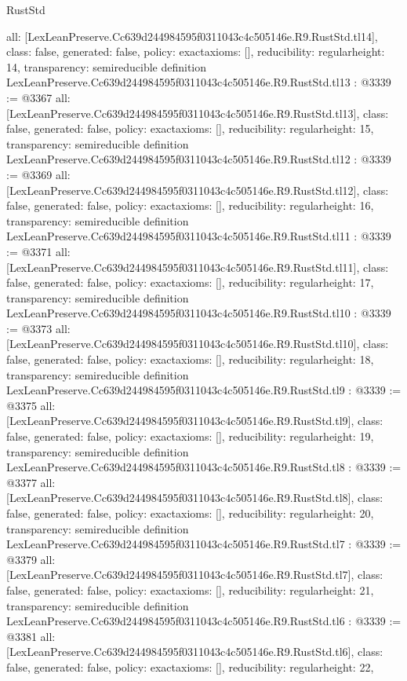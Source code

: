 \begin{lexlean}{RustStd}
\begin{coremodule}
{  all: [LexLeanPreserve.Cc639d244984595f0311043c4c505146e.R9.RustStd.tl14],
  class: false,
  generated: false,
  policy: exact{axioms: []},
  reducibility: regular{height: 14},
  transparency: semireducible
}
definition LexLeanPreserve.Cc639d244984595f0311043c4c505146e.R9.RustStd.tl13 : @3339 := @3367 {
  all: [LexLeanPreserve.Cc639d244984595f0311043c4c505146e.R9.RustStd.tl13],
  class: false,
  generated: false,
  policy: exact{axioms: []},
  reducibility: regular{height: 15},
  transparency: semireducible
}
definition LexLeanPreserve.Cc639d244984595f0311043c4c505146e.R9.RustStd.tl12 : @3339 := @3369 {
  all: [LexLeanPreserve.Cc639d244984595f0311043c4c505146e.R9.RustStd.tl12],
  class: false,
  generated: false,
  policy: exact{axioms: []},
  reducibility: regular{height: 16},
  transparency: semireducible
}
definition LexLeanPreserve.Cc639d244984595f0311043c4c505146e.R9.RustStd.tl11 : @3339 := @3371 {
  all: [LexLeanPreserve.Cc639d244984595f0311043c4c505146e.R9.RustStd.tl11],
  class: false,
  generated: false,
  policy: exact{axioms: []},
  reducibility: regular{height: 17},
  transparency: semireducible
}
definition LexLeanPreserve.Cc639d244984595f0311043c4c505146e.R9.RustStd.tl10 : @3339 := @3373 {
  all: [LexLeanPreserve.Cc639d244984595f0311043c4c505146e.R9.RustStd.tl10],
  class: false,
  generated: false,
  policy: exact{axioms: []},
  reducibility: regular{height: 18},
  transparency: semireducible
}
definition LexLeanPreserve.Cc639d244984595f0311043c4c505146e.R9.RustStd.tl9 : @3339 := @3375 {
  all: [LexLeanPreserve.Cc639d244984595f0311043c4c505146e.R9.RustStd.tl9],
  class: false,
  generated: false,
  policy: exact{axioms: []},
  reducibility: regular{height: 19},
  transparency: semireducible
}
definition LexLeanPreserve.Cc639d244984595f0311043c4c505146e.R9.RustStd.tl8 : @3339 := @3377 {
  all: [LexLeanPreserve.Cc639d244984595f0311043c4c505146e.R9.RustStd.tl8],
  class: false,
  generated: false,
  policy: exact{axioms: []},
  reducibility: regular{height: 20},
  transparency: semireducible
}
definition LexLeanPreserve.Cc639d244984595f0311043c4c505146e.R9.RustStd.tl7 : @3339 := @3379 {
  all: [LexLeanPreserve.Cc639d244984595f0311043c4c505146e.R9.RustStd.tl7],
  class: false,
  generated: false,
  policy: exact{axioms: []},
  reducibility: regular{height: 21},
  transparency: semireducible
}
definition LexLeanPreserve.Cc639d244984595f0311043c4c505146e.R9.RustStd.tl6 : @3339 := @3381 {
  all: [LexLeanPreserve.Cc639d244984595f0311043c4c505146e.R9.RustStd.tl6],
  class: false,
  generated: false,
  policy: exact{axioms: []},
  reducibility: regular{height: 22},
}
\end{coremodule}
\end{lexlean}
